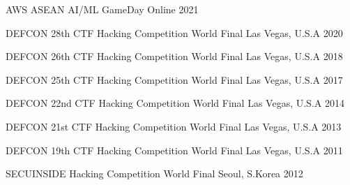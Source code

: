



\begin{cvhonours}

	{AWS ASEAN AI/ML GameDay} %
	{Online} %
	{2021} %

	{DEFCON 28th CTF Hacking Competition World Final} %
	{Las Vegas, U.S.A} %
	{2020} %

	{DEFCON 26th CTF Hacking Competition World Final} %
	{Las Vegas, U.S.A} %
	{2018} %

	{DEFCON 25th CTF Hacking Competition World Final} %
	{Las Vegas, U.S.A} %
	{2017} %

	{DEFCON 22nd CTF Hacking Competition World Final} %
	{Las Vegas, U.S.A} %
	{2014} %

	{DEFCON 21st CTF Hacking Competition World Final} %
	{Las Vegas, U.S.A} %
	{2013} %

	{DEFCON 19th CTF Hacking Competition World Final} %
	{Las Vegas, U.S.A} %
	{2011} %

	{SECUINSIDE Hacking Competition World Final} %
	{Seoul, S.Korea} %
	{2012} %

\end{cvhonours}


